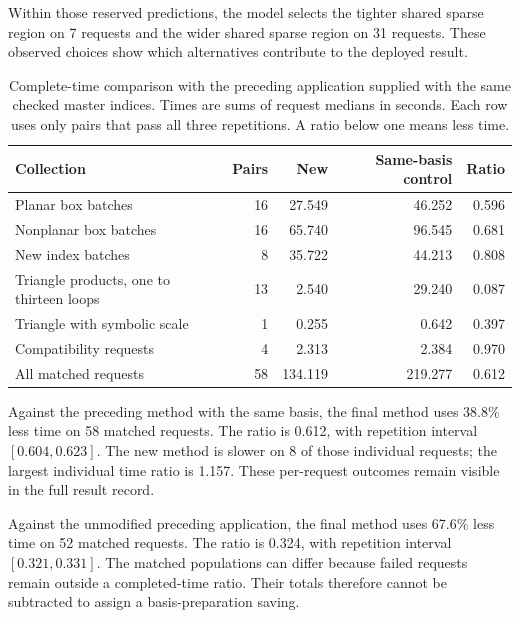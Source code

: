 Within those reserved predictions, the model selects the tighter shared sparse region on 7 requests and the wider shared sparse region on 31 requests. These observed choices show which alternatives contribute to the deployed result.

\begin{table}[!htbp]\centering\small
\caption{Complete-time comparison with the preceding application supplied with the same checked master indices. Times are sums of request medians in seconds. Each row uses only pairs that pass all three repetitions. A ratio below one means less time.}
\label{tab:notes-analytic-batch-times}
\begin{tabularx}{\linewidth}{@{}Yrrrr@{}}\toprule
Collection & Pairs & New & Same-basis control & Ratio\\\midrule
Planar box batches & 16 & 27.549 & 46.252 & 0.596 \\
Nonplanar box batches & 16 & 65.740 & 96.545 & 0.681 \\
New index batches & 8 & 35.722 & 44.213 & 0.808 \\
Triangle products, one to thirteen loops & 13 & 2.540 & 29.240 & 0.087 \\
Triangle with symbolic scale & 1 & 0.255 & 0.642 & 0.397 \\
Compatibility requests & 4 & 2.313 & 2.384 & 0.970 \\
All matched requests & 58 & 134.119 & 219.277 & 0.612 \\
\bottomrule\end{tabularx}\end{table}

Against the preceding method with the same basis, the final method uses 38.8\% less time on 58 matched requests. The ratio is 0.612, with repetition interval $[0.604,0.623]$. The new method is slower on 8 of those individual requests; the largest individual time ratio is 1.157. These per-request outcomes remain visible in the full result record.

Against the unmodified preceding application, the final method uses 67.6\% less time on 52 matched requests. The ratio is 0.324, with repetition interval $[0.321,0.331]$. The matched populations can differ because failed requests remain outside a completed-time ratio. Their totals therefore cannot be subtracted to assign a basis-preparation saving.


